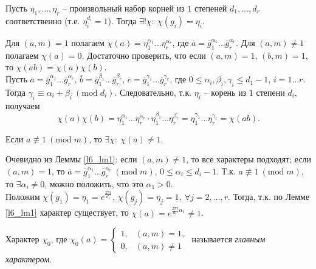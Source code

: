 \begin{lemma} \label{l6_lm1}
	Пусть $\eta_1, \dots, \eta_r$ -- произвольный набор корней из $1$ степеней $d_1, \dots, d_r$ соответственно (т.е. $\eta_i^{d_i} = 1$).
	Тогда $\exists! \chi: \ \chi(g_i) = \eta_i$.
\end{lemma}
\begin{pf}
	Для $(a,m)=1$ полагаем $\chi(a) = \eta_1^{\alpha_1} \dots \eta_r^{\alpha_r}$, где $\overline{a} = \overline{g}_1^{\alpha_1} \dots \overline{g}_r^{\alpha_r}$. Для $(a,m) \ne 1$ полагаем $\chi(a) = 0$. Достаточно проверить, что если
	$(a,m)=1, \, (b,m)=1$, то $\chi(ab) = \chi(a)\chi(b)$.\\
	Пусть $\overline{a} = \overline{g}_1^{\alpha_1} \dots \overline{g}_r^{\alpha_r}, \, \overline{b} = \overline{g}_1^{\beta_1} \dots \overline{g}_r^{\beta_r}, \, \overline{c} = \overline{g}_1^{\gamma_1} \dots \overline{g}_r^{\gamma_r}$, где $0 \leq \alpha_i, \beta_i, \gamma_i \leq d_1 - 1, \, i=1 \dots r$.
	Тогда $\gamma_i \equiv \alpha_i + \beta_i \ (\mathrm{mod} \; d_i)$. Следовательно, т.к. $\eta_i$ -- корень из $1$ степени $d_i$, получаем
	$$\chi(a)\chi(b) = \eta_1^{\alpha_1} \dots \eta_r^{\alpha_r} \cdot \eta_1^{\beta_1} \dots \eta_r^{\beta_r} = \eta_1^{\gamma_1} \dots \eta_r^{\gamma_r} = \chi(ab).$$
\end{pf}

\begin{lemma} \label{l6_lm2}
	Если $a \not \equiv 1 \ (\mathrm{mod} \; m)$, то $\exists \chi: \ \chi(a) \ne 1$.
\end{lemma}
\begin{pf}
	Очевидно из Леммы \ref{l6_lm1}: если $(a,m) \ne 1$, то все характеры подходят; если $(a,m) = 1$, то $\overline{a}=\overline{g}_1^{\alpha_1} \dots \overline{g}_r^{\alpha_r} \ (\mathrm{mod} \; m), \, 0 \leq \alpha_i \leq d_i-1$. Т.к. $a \not\equiv 1 \ (\mathrm{mod} \; m)$, то $\exists \alpha_i \ne 0$, можно положить, что это $\alpha_1 > 0$.\\
	Положим $\chi\left( g_1 \right) = \eta_1 = e^{\frac{2\pi i}{d_1}}, \, \chi\left( g_j \right) = \eta_j = 1, \ \forall j = 2, \dots, r$.		Тогда, т.к. по Лемме \ref{l6_lm1} характер существует, то $\chi(a) = e^{\frac{2\pi i}{d_1}\alpha_1} \ne 1$.
\end{pf}

\begin{definition}
	Характер $\chi_0$, где $\chi_0(a) = \begin{cases}
		1, & (a,m)=1, \\
		0, & (a,m) \ne 1
	\end{cases}$ называется \textit{главным характером}.
\end{definition}

